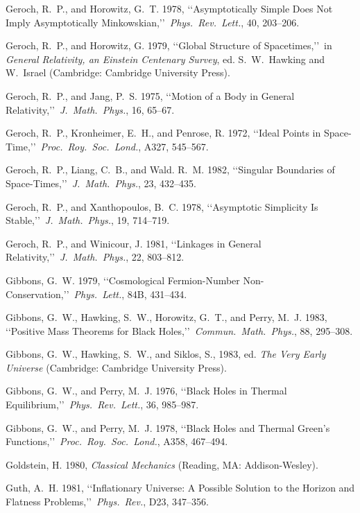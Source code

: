 \item Geroch, R.~P., and Horowitz, G.~T. 1978, \lq\lq Asymptotically Simple Does Not Imply Asymptotically Minkowskian,\rq\rq\ \emph{Phys.\ Rev.\ Lett.}, 40, 203--206.
\item Geroch, R.~P., and Horowitz, G. 1979, \lq\lq Global Structure of Spacetimes,\rq\rq\ in \emph{General Relativity, an Einstein Centenary Survey}, ed. S.~W.~Hawking and W.~Israel (Cambridge: Cambridge University Press).
\item Geroch, R.~P., and Jang, P.~S. 1975, \lq\lq Motion of a Body in General Relativity,\rq\rq\ \emph{J.\ Math.\ Phys.}, 16, 65--67.
\item Geroch, R.~P., Kronheimer, E.~H., and Penrose, R. 1972, \lq\lq Ideal Points in Space-Time,\rq\rq\ \emph{Proc.\ Roy.\ Soc.\ Lond.}, A327, 545--567.
\item Geroch, R.~P., Liang, C.~B., and Wald. R.~M. 1982, \lq\lq Singular Boundaries of Space-Times,\rq\rq\ \emph{J.\ Math.\ Phys.}, 23, 432--435.
\item Geroch, R.~P., and Xanthopoulos, B.~C. 1978, \lq\lq Asymptotic Simplicity Is Stable,\rq\rq\ \emph{J.\ Math.\ Phys.}, 19, 714--719.
\item Geroch, R.~P., and Winicour, J. 1981, \lq\lq Linkages in General Relativity,\rq\rq\ \emph{J.\ Math.\ Phys.}, 22, 803--812.
\item Gibbons, G.~W. 1979, \lq\lq Cosmological Fermion-Number Non-Conservation,\rq\rq\ \emph{Phys.\ Lett.}, 84B, 431--434.
\item Gibbons, G.~W., Hawking, S.~W., Horowitz, G.~T., and Perry, M.~J. 1983, \lq\lq Positive Mass Theorems for Black Holes,\rq\rq\ \emph{Commun.\ Math.\ Phys.}, 88, 295--308.
\item Gibbons, G.~W., Hawking, S.~W., and Siklos, S., 1983, ed. \emph{The Very Early Universe} (Cambridge: Cambridge University Press).
\item Gibbons, G.~W., and Perry, M.~J. 1976, \lq\lq Black Holes in Thermal Equilibrium,\rq\rq\ \emph{Phys.\ Rev.\ Lett.}, 36, 985--987.
\item Gibbons, G.~W., and Perry, M.~J. 1978, \lq\lq Black Holes and Thermal Green's Functions,\rq\rq\ \emph{Proc.\ Roy.\ Soc.\ Lond.}, A358, 467--494.
\item Goldstein, H. 1980, \emph{Classical Mechanics} (Reading, MA: Addison-Wesley).
\item Guth, A.~H. 1981, \lq\lq Inflationary Universe: A Possible Solution to the Horizon and Flatness Problems,\rq\rq\ \emph{Phys.\ Rev.}, D23, 347--356.
